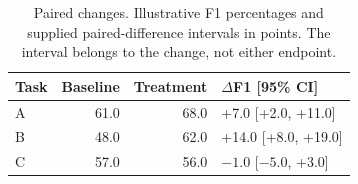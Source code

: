 \begin{table}[!htbp]
\centering\small
\begin{tabular}{lrrl}
\toprule
Task & Baseline & Treatment & $\Delta$F1 [95\% CI] \\
\midrule
A & 61.0 & 68.0 & +7.0 [+2.0, +11.0] \\
B & 48.0 & 62.0 & +14.0 [+8.0, +19.0] \\
C & 57.0 & 56.0 & $-1.0$ [$-5.0$, +3.0] \\
\bottomrule
\end{tabular}
\caption{Paired changes. Illustrative F1 percentages and supplied paired-difference intervals in points. The interval belongs to the change, not either endpoint.}
\label{tab:paired-changes}
\end{table}
